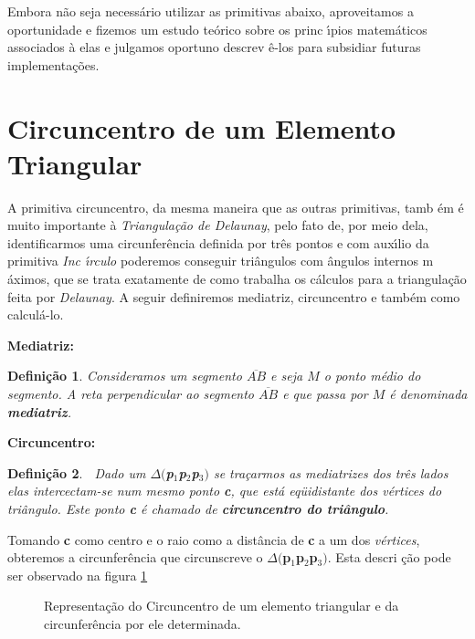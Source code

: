 \documentclass[12pt,a4paper]{book}
\newtheorem{Def}{Defini\c{c}\~{a}o}
\begin{document}
Embora n\~{a}o seja necess\'{a}rio utilizar as primitivas abaixo,
aproveitamos a oportunidade e fizemos um estudo te\'{o}rico sobre os princ%
\'{\i}pios matem\'{a}ticos associados \`{a} elas e julgamos oportuno descrev%
\^{e}-los para subsidiar futuras implementa\c{c}\~{o}es.



\section{Circuncentro de um Elemento Triangular}

A primitiva circuncentro, da mesma maneira que as outras primitivas, tamb%
\'{e}m \'{e} muito importante \`{a} \textit{Triangula\c{c}\~{a}o de Delaunay}, 
pelo fato de, por meio dela, identificarmos uma circunfer\^{e}ncia
definida por tr\^{e}s pontos e com aux\'{\i}lio da primitiva \textit{Inc%
\'{\i}rculo }poderemos conseguir tri\^{a}ngulos com \^{a}ngulos internos m%
\'{a}ximos, que se trata exatamente de como trabalha os c\'{a}lculos para a
triangula\c{c}\~{a}o feita por \textit{Delaunay}. A seguir definiremos
mediatriz, circuncentro e tamb\'{e}m como calcul\'{a}-lo.


\textbf{Mediatriz:}

\begin{Def}
 Consideramos um segmento $\overline{AB}$ e seja $M$ o ponto m\'{e}dio do
segmento. A reta perpendicular ao segmento $\overline{AB}$ e que passa por $%
M $ \'{e} denominada \textbf{mediatriz}\textit{.}\textbf{\ }
\end{Def}

\textbf{Circuncentro:}

\begin{Def}
\textbf{\ }Dado um $\Delta ($\textbf{p}$_{1}$\textbf{p}$_{2}$\textbf{p}$%
_{3}) $ se tra\c{c}armos as mediatrizes dos tr\^{e}s lados elas
intercectam-se num mesmo ponto \textbf{c}, que est\'{a} eq\"{u}idistante dos 
\textit{v\'{e}rtices} do tri\^{a}ngulo. Este ponto \textbf{c} \'{e} chamado de 
\textbf{circuncentro do tri\^{a}ngulo}.
\end{Def}

Tomando \textbf{c} como centro e o raio como a dist\^{a}ncia de \textbf{c} a
um dos \textit{v\'{e}rtices}, obteremos a circunfer\^{e}ncia que circunscreve
o $\Delta ($\textbf{p}$_{1}$\textbf{p}$_{2}$\textbf{p}$_{3})$. Esta descri%
\c{c}\~{a}o pode ser observado na figura \ref{fig3_chapter2}


\begin{figure}[htbp]
  \begin{center}
    \leavevmode
    
    \caption{Representa\c{c}\~{a}o do Circuncentro de um elemento triangular e da 
	              circunfer\^{e}ncia por ele determinada.}
    \label{fig3_chapter2}
  \end{center}
\end{figure}
\end{document}
